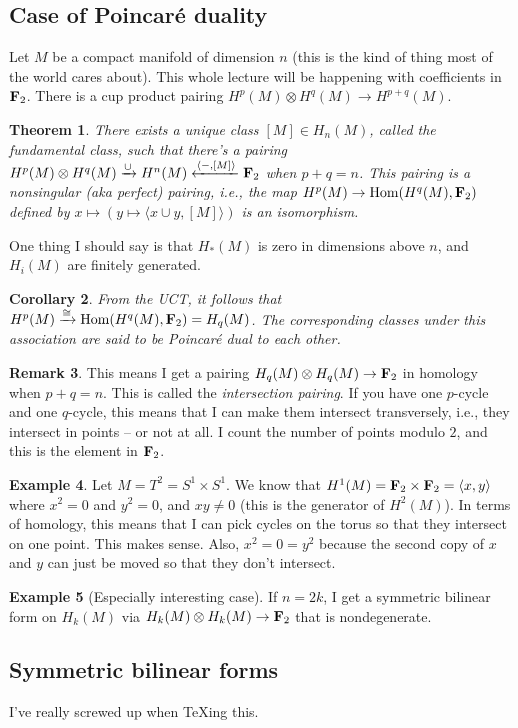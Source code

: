 \documentclass{amsart}
\theoremstyle{theorem}
\newtheorem{theorem}{Theorem}[section]
\newtheorem{corollary}[theorem]{Corollary}
\theoremstyle{definition}
\newtheorem{remark}[theorem]{Remark}
\newtheorem{example}[theorem]{Example}
\DeclareMathOperator{\Hom}{Hom}
\begin{document}
\subsection{Case of Poincar\'{e} duality}
Let $M$ be a compact manifold of dimension $n$ (this is the kind of thing most of the world cares about). This whole lecture will be happening with coefficients in $\mathbf F_2$. There is a cup product pairing $ H^p(M)\otimes H^q(M)\to H^{p+q}(M)$.
\begin{theorem}
There exists a unique class $[M]\in H_n(M)$, called the fundamental class, such that there's a pairing $ H^p(M)\otimes H^q(M)\xrightarrow{\cup} H^n(M)\xleftarrow{\langle -,[M]\rangle}\mathbf F_2$ when $p+q=n$. This pairing is a nonsingular (aka perfect) pairing, i.e., the map $ H^p(M)\to\Hom( H^q(M),\FF_2)$ defined by $x\mapsto(y\mapsto\langle x\cup y,[M]\rangle)$ is an isomorphism.
\end{theorem}
One thing I should say is that $ H_\ast(M)$ is zero in dimensions above $n$, and $ H_i(M)$ are finitely generated.
\begin{corollary}
From the UCT, it follows that $ H^p(M)\xrightarrow{\cong}\Hom( H^q(M),\FF_2)= H_q(M)$. The corresponding classes under this association are said to be Poincar\'{e} dual to each other.
\end{corollary}
\begin{remark}
This means I get a pairing $ H_q(M)\otimes H_q(M)\to \mathbf F_2$ in homology when $p+q=n$. This is called the \emph{intersection pairing}. If you have one $p$-cycle and one $q$-cycle, this means that I can make them intersect transversely, i.e., they intersect in points -- or not at all. I count the number of points modulo $2$, and this is the element in $\mathbf F_2$.
\end{remark}
\begin{example}
Let $M=T^2=S^1\times S^1$. We know that $ H^1(M)=\mathbf F_2\times\mathbf F_2=\langle x,y\rangle$ where $x^2=0$ and $y^2=0$, and $xy\neq 0$ (this is the generator of $ H^2(M)$). In terms of homology, this means that I can pick cycles on the torus so that they intersect on one point. This makes sense. Also, $x^2=0=y^2$ because the second copy of $x$ and $y$ can just be moved so that they don't intersect.
\end{example}
\begin{example}[Especially interesting case]
If $n=2k$, I get a symmetric bilinear form on $ H_k(M)$ via $ H_k(M)\otimes H_k(M)\to \mathbf F_2$ that is nondegenerate.
\end{example}
\subsection{Symmetric bilinear forms}
I've really screwed up when TeXing this.
\end{document}
